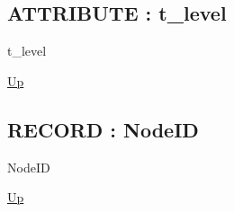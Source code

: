 \par
\par
\subsection*{ATTRIBUTE : t\_level}
\hypertarget{ecldoc:ml_core.types.t_level}{}
\begin{minipage}[t]{\textwidth}
\begin{flushleft}
 t\_level 
\end{flushleft}
\end{minipage}
\hyperlink{ecldoc:ML_Core.Types}{Up}

\par
\par
\subsection*{RECORD : NodeID}
\hypertarget{ecldoc:ml_core.types.nodeid}{}
\begin{minipage}[t]{\textwidth}
\begin{flushleft}
 NodeID 
\end{flushleft}
\end{minipage}
\hyperlink{ecldoc:ML_Core.Types}{Up}

\par
\par

